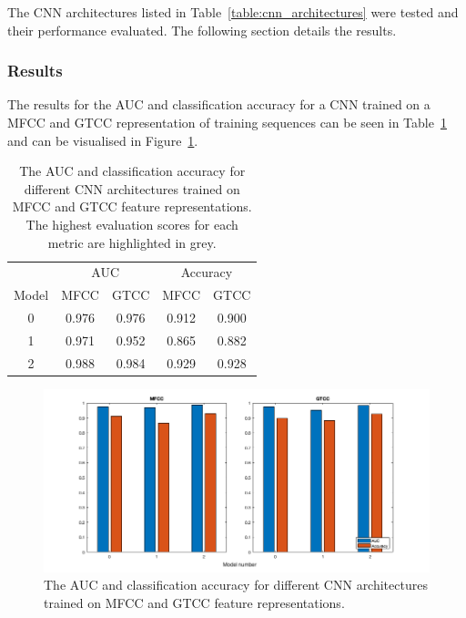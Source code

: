 The CNN architectures listed in Table~\ref{table:cnn_architectures} were tested
and their performance evaluated. The following section details the results.

\subsubsection{Results}

The results for the AUC and classification accuracy for a CNN trained on a MFCC
and GTCC representation of training sequences can be seen in
Table~\ref{table:cnn_mfcc_results} and can be visualised in
Figure~\ref{fig:cnn_mfcc_results}.

\begin{table}[ht]
\begin{center}
\begin{tabular}{c c c|c c}
\toprule
& \multicolumn{2}{c|}{AUC} & \multicolumn{2}{c}{Accuracy} \\
  Model & MFCC & GTCC & MFCC & GTCC \\ [0.5ex]
\midrule
  0 & 0.976 & 0.976 & 0.912 & 0.900 \\
  1 & 0.971 & 0.952 & 0.865 & 0.882 \\
  2 & \cellcolor{lightgray} 0.988 & \cellcolor{lightgray} 0.984 & \cellcolor{lightgray} 0.929 & \cellcolor{lightgray} 0.928 \\
\bottomrule
\end{tabular}
\caption{The AUC and classification accuracy for different CNN architectures
trained on MFCC and GTCC feature representations. The highest evaluation scores
for each metric are highlighted in grey.}\label{table:cnn_mfcc_results}
\end{center}
\end{table}

\begin{figure}[ht]
  \centering
  \includegraphics[width=\textwidth]{figures/hyp2_cnn_bar.png}
  \caption{The AUC and classification accuracy for different CNN architectures
  trained on MFCC and GTCC feature representations.}\label{fig:cnn_mfcc_results}
\end{figure}

